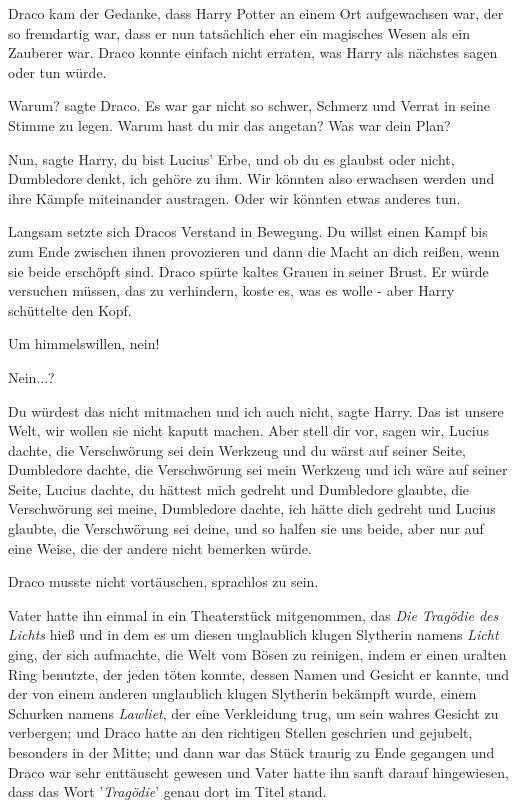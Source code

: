 Draco kam der Gedanke, dass Harry Potter an einem Ort aufgewachsen war, der so
fremdartig war, dass er nun tatsächlich eher ein magisches Wesen als ein
Zauberer war. Draco konnte einfach nicht erraten, was Harry als nächstes sagen
oder tun würde.

\glqq{}Warum?\grqq{} sagte Draco. Es war gar nicht so schwer, Schmerz und Verrat
in seine Stimme zu legen. \glqq{}Warum hast du mir das angetan? Was war dein
Plan?\grqq{}

\glqq{}Nun\grqq{}, sagte Harry, \glqq{}du bist Lucius' Erbe, und ob du es
glaubst oder nicht, Dumbledore denkt, ich gehöre zu ihm. Wir könnten also
erwachsen werden und ihre Kämpfe miteinander austragen. Oder wir könnten etwas
anderes tun.\grqq{}

Langsam setzte sich Dracos Verstand in Bewegung. \glqq{}Du willst einen Kampf
bis zum Ende zwischen ihnen provozieren und dann die Macht an dich reißen, wenn
sie beide erschöpft sind.\grqq{} Draco spürte kaltes Grauen in seiner Brust. Er
würde versuchen müssen, das zu verhindern, koste es, was es wolle - aber Harry
schüttelte den Kopf.

\glqq{}Um himmelswillen, nein!\grqq{}

\glqq{}Nein...?\grqq{}

\glqq{}Du würdest das nicht mitmachen und ich auch nicht\grqq{}, sagte Harry.
\glqq{}Das ist unsere Welt, wir wollen sie nicht kaputt machen. Aber stell dir
vor, sagen wir, Lucius dachte, die Verschwörung sei dein Werkzeug und du wärst
auf seiner Seite, Dumbledore dachte, die Verschwörung sei mein Werkzeug und ich
wäre auf seiner Seite, Lucius dachte, du hättest mich gedreht und Dumbledore
glaubte, die Verschwörung sei meine, Dumbledore dachte, ich hätte dich gedreht
und Lucius glaubte, die Verschwörung sei deine, und so halfen sie uns beide,
aber nur auf eine Weise, die der andere nicht bemerken würde.\grqq{}

Draco musste nicht vortäuschen, sprachlos zu sein.

Vater hatte ihn einmal in ein Theaterstück mitgenommen, das \emph{\glqq{}Die
Tragödie des Lichts\grqq{}} hieß und in dem es um diesen unglaublich klugen
Slytherin namens \emph{Licht} ging, der sich aufmachte, die Welt vom Bösen zu
reinigen, indem er einen uralten Ring benutzte, der jeden töten konnte, dessen
Namen und Gesicht er kannte, und der von einem anderen unglaublich klugen
Slytherin bekämpft wurde, einem Schurken namens \emph{Lawliet}, der eine
Verkleidung trug, um sein wahres Gesicht zu verbergen; und Draco hatte an den
richtigen Stellen geschrien und gejubelt, besonders in der Mitte; und dann war
das Stück traurig zu Ende gegangen und Draco war sehr enttäuscht gewesen und
Vater hatte ihn sanft darauf hingewiesen, dass das Wort '\emph{Tragödie}' genau
dort im Titel stand.

